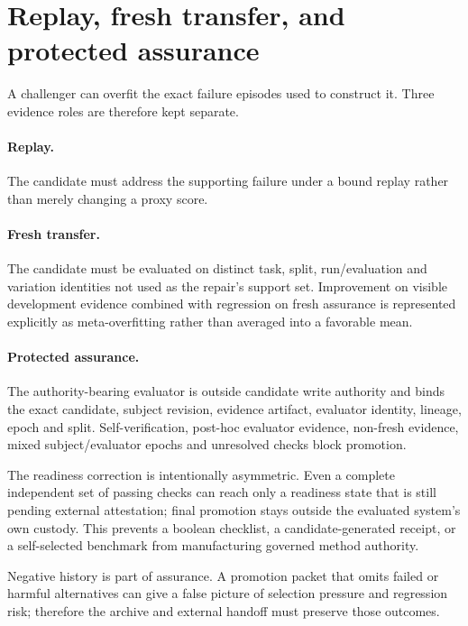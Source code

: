 \section{Replay, fresh transfer, and protected assurance}

A challenger can overfit the exact failure episodes used to construct it. Three evidence roles are therefore kept separate.

\paragraph{Replay.}
The candidate must address the supporting failure under a bound replay rather than merely changing a proxy score.

\paragraph{Fresh transfer.}
The candidate must be evaluated on distinct task, split, run/evaluation and variation identities not used as the repair's support set. Improvement on visible development evidence combined with regression on fresh assurance is represented explicitly as meta-overfitting rather than averaged into a favorable mean.

\paragraph{Protected assurance.}
The authority-bearing evaluator is outside candidate write authority and binds the exact candidate, subject revision, evidence artifact, evaluator identity, lineage, epoch and split. Self-verification, post-hoc evaluator evidence, non-fresh evidence, mixed subject/evaluator epochs and unresolved checks block promotion.

The readiness correction is intentionally asymmetric. Even a complete independent set of passing checks can reach only a readiness state that is still pending external attestation; final promotion stays outside the evaluated system's own custody. This prevents a boolean checklist, a candidate-generated receipt, or a self-selected benchmark from manufacturing governed method authority.

Negative history is part of assurance. A promotion packet that omits failed or harmful alternatives can give a false picture of selection pressure and regression risk; therefore the archive and external handoff must preserve those outcomes.
